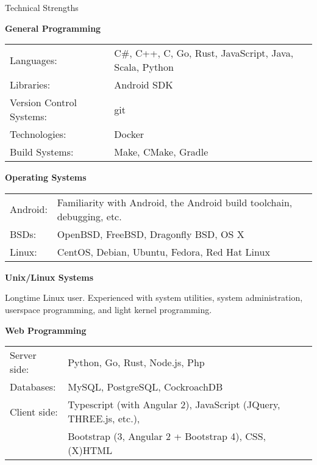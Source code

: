 \documentclass{resume} %
\newcommand{\btab}[2]{
	\bgroup
	\def\arraystretch{#1}
	\begin{tabular}{#2}
}
\newcommand{\etab}{
	\end{tabular} \smallskip
	\egroup
}
\begin{document}
\begin{rSection}{Technical Strengths}

{\bf General Programming}

\btab{1.1}{ l l }
	Languages: &  C\#, C++, C, Go, Rust, JavaScript, Java, Scala, Python \\
	Libraries: & Android SDK \\
	Version Control Systems: & git \\
	Technologies: & Docker \\
	Build Systems: & Make, CMake, Gradle \\
\etab

{\bf Operating Systems}

\btab{1.1}{ l l }
	Android: & Familiarity with Android, the Android build toolchain, debugging, etc. \\
	BSDs: & OpenBSD, FreeBSD, Dragonfly BSD, OS X \\
	Linux: & CentOS, Debian, Ubuntu, Fedora, Red Hat Linux \\
\etab

{\bf Unix/Linux Systems}

Longtime Linux user. Experienced with system utilities, system administration,
userspace programming, and light kernel programming.

{\bf Web Programming}

\btab{1.1}{ l l }
	Server side: & Python, Go, Rust, Node.js, Php \\
	Databases: & MySQL, PostgreSQL, CockroachDB \\
	Client side: & Typescript (with Angular 2), JavaScript (JQuery, THREE.js, etc.), \\ & Bootstrap (3, Angular 2 + Bootstrap 4), CSS, (X)HTML \\
\etab

\end{rSection}
\end{document}
